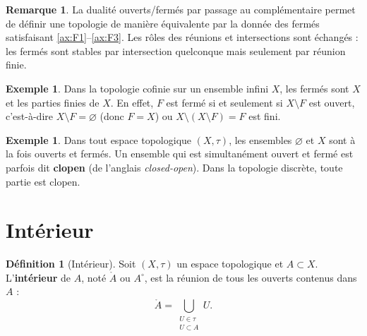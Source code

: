 \documentclass[12pt,a4paper,openany]{book}
\theoremstyle{definition}
\newtheorem{definition}{Définition}[chapter]
\theoremstyle{cours}
\theoremstyle{coursnormal}
\newtheorem{remarque}[theoreme]{Remarque}
\newtheorem{exemple}[theoreme]{Exemple}
\newcommand{\Int}[1]{\mathring{#1}}
\begin{document}
\begin{remarque}
  La dualité ouverts/fermés par passage au complémentaire permet de définir une topologie de manière équivalente par la donnée des fermés satisfaisant \ref{ax:F1}--\ref{ax:F3}. Les rôles des réunions et intersections sont échangés : les fermés sont stables par intersection quelconque mais seulement par réunion finie.
\end{remarque}

\begin{exemple}\label{ex:fermes-cofinie}
  Dans la topologie cofinie sur un ensemble infini $X$, les fermés sont $X$ et les parties finies de $X$. En effet, $F$ est fermé si et seulement si $X \setminus F$ est ouvert, c'est-à-dire $X \setminus F = \varnothing$ (donc $F = X$) ou $X \setminus (X \setminus F) = F$ est fini.
\end{exemple}

\begin{exemple}\label{ex:ouverts-et-fermes}
  Dans tout espace topologique $(X,\tau)$, les ensembles $\varnothing$ et $X$ sont à la fois ouverts et fermés. Un ensemble qui est simultanément ouvert et fermé est parfois dit \textbf{clopen} (de l'anglais \emph{closed-open}). Dans la topologie discrète, toute partie est clopen.
\end{exemple}

\section{Intérieur}
\label{sec:interieur}

\begin{definition}[Intérieur]\label{def:interieur}
  Soit $(X,\tau)$ un espace topologique et $A \subset X$. L'\textbf{intérieur} de $A$, noté $\Int{A}$ ou $A^\circ$, est la réunion de tous les ouverts contenus dans $A$ :
  \[
    \Int{A} = \bigcup_{\substack{U \in \tau \\ U \subset A}} U.
  \]
\end{definition}
\end{document}
